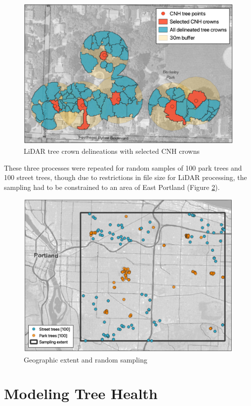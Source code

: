 \documentclass[12pt,twoside]{reedthesis}
\begin{document}
\begin{figure}

{\centering \includegraphics[width=1\linewidth]{figure/selected_lidar} 

}

\caption{LiDAR tree crown delineations with selected CNH crowns}\label{fig:unnamed-chunk-6}
\end{figure}
These three processes were repeated for random samples of 100 park trees and 100 street trees, though due to restrictions in file size for LiDAR processing, the sampling had to be constrained to an area of East Portland (Figure \ref{fig:clip-extent}).
\begin{figure}

{\centering \includegraphics[width=1\linewidth]{figure/extent_and_samples} 

}

\caption{Geographic extent and random sampling}\label{fig:clip-extent}
\end{figure}
\hypertarget{modeling-tree-health}{%
\section{Modeling Tree Health}\label{modeling-tree-health}}
\end{document}
